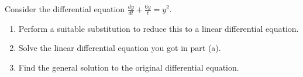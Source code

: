 \documentclass[../main.tex]{subfiles}
\begin{document}
\begin{exercise} \label{ex:bernoulli-midterm-2025}
  Consider the differential equation \(\frac{dy}{dt} + \frac{6y}{t} = y^{2}\).

  \begin{enumerate}[wide]
    \item Perform a suitable substitution to reduce this to a linear differential equation. 


    \item Solve the linear differential equation you got in part (a).


    \item Find the general solution to the original differential equation.

      \blanks*
  \end{enumerate}
\end{exercise}
\clearpage
\end{document}
